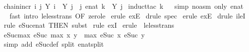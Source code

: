 \begin{isabellebody}
\endisatagproof
{\isafoldproof}%
%
\isadelimproof
\isanewline
%
\endisadelimproof
\isanewline
{}\isamarkupfalse%
\ chain{\isacharunderscore}incr{\isacharcolon}\ {\isachardoublequoteopen}{\isasymforall}i{\isachardot}\ {\isasymexists}j{\isachardot}\ Y\ i\ {\isacharless}\ Y\ j\ {\isasymLongrightarrow}\ {\isasymexists}j{\isachardot}\ enat\ k\ {\isacharless}\ Y\ j{\isachardoublequoteclose}\isanewline
%
\isadelimproof
%
\endisadelimproof
%
\isatagproof
{}\isamarkupfalse%
\ {\isacharparenleft}induct{\isacharunderscore}tac\ k{\isacharparenright}\isanewline
\ \isamarkupfalse%
\ {\isacharparenleft}simp\ {\isacharparenleft}no{\isacharunderscore}asm{\isacharparenright}\ only{\isacharcolon}\ enat{\isacharunderscore}{}{\isacharparenright}\isanewline
\ \isamarkupfalse%
\ {\isacharparenleft}fast\ intro{\isacharcolon}\ le{\isacharunderscore}less{\isacharunderscore}trans\ {\isacharbrackleft}OF\ zero{\isacharunderscore}le{\isacharbrackright}{\isacharparenright}\isanewline
{}\isamarkupfalse%
\ {\isacharparenleft}erule\ exE{\isacharparenright}\isanewline
{}\isamarkupfalse%
\ {\isacharparenleft}drule\ spec{\isacharparenright}\isanewline
{}\isamarkupfalse%
\ {\isacharparenleft}erule\ exE{\isacharparenright}\isanewline
{}\isamarkupfalse%
\ {\isacharparenleft}drule\ ileI{}{\isacharparenright}\isanewline
{}\isamarkupfalse%
\ {\isacharparenleft}rule\ eSuc{\isacharunderscore}enat\ {\isacharbrackleft}THEN\ subst{\isacharbrackright}{\isacharparenright}\isanewline
{}\isamarkupfalse%
\ {\isacharparenleft}rule\ exI{\isacharparenright}\isanewline
{}\isamarkupfalse%
\ {\isacharparenleft}erule\ {\isacharparenleft}{}{\isacharparenright}\ le{\isacharunderscore}less{\isacharunderscore}trans{\isacharparenright}\isanewline
{}\isamarkupfalse%
%
\endisatagproof
{\isafoldproof}%
%
\isadelimproof
\isanewline
%
\endisadelimproof
\isanewline
{}\isamarkupfalse%
\ eSuc{\isacharunderscore}max{\isacharcolon}\ {\isachardoublequoteopen}eSuc\ {\isacharparenleft}max\ x\ y{\isacharparenright}\ {\isacharequal}\ max\ {\isacharparenleft}eSuc\ x{\isacharparenright}\ {\isacharparenleft}eSuc\ y{\isacharparenright}{\isachardoublequoteclose}\isanewline
%
\isadelimproof
\ \ %
\endisadelimproof
%
\isatagproof
{}\isamarkupfalse%
\ {\isacharparenleft}simp\ add{\isacharcolon}\ eSuc{\isacharunderscore}def\ split{\isacharcolon}\ enat{\isachardot}split{\isacharparenright}%

\end{isabellebody}
